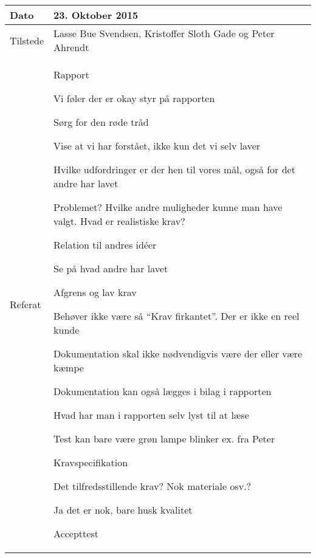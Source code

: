 \begin{center}
	\begin{tabular}{| l | p{10cm} |}
		\hline
		Dato		& 23. Oktober 2015\\ \hline
		Tilstede 	& Lasse Bue Svendsen, Kristoffer Sloth Gade og Peter Ahrendt\\ \hline
		Referat		& \vspace{-5mm}\begin{myEnumerate}
			\item Rapport
			\begin{myItemize}				
				\item Vi føler der er okay styr på rapporten
				\item Sørg for den røde tråd
				\item Vise at vi har forstået, ikke  kun det vi selv laver
				\item Hvilke udfordringer er der hen til vores mål, også for det andre har lavet
				\item Problemet? Hvilke andre muligheder kunne man have valgt. Hvad er realistiske krav?
				\item Relation til andres idéer
				\item Se på hvad andre har lavet
				\begin{myItemize}
					\item Afgrens og lav krav
				\end{myItemize}
				\item Behøver ikke være så “Krav firkantet”. Der er ikke en reel kunde
				\item Dokumentation skal ikke nødvendigvis være der eller være kæmpe
				\item Dokumentation kan også lægges i bilag i rapporten
				\item Hvad har man i rapporten selv lyst til at læse
				\item Test kan bare være grøn lampe blinker ex. fra Peter		
			\end{myItemize}
			\item Kravspecifikation
			\begin{myItemize}
				\item Det tilfredsstillende krav? Nok materiale osv.?
				\begin{myItemize}
					\item Ja det er nok, bare husk kvalitet
				\end{myItemize}
			\end{myItemize}
			\item Accepttest
			\begin{myItemize}

\end{myItemize}
\end{myEnumerate}
\end{tabular}
\end{center}
